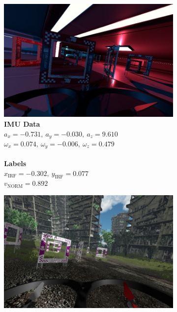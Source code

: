 \begin{figure}[H]
	\centering
	\begin{subfigure}[b]{1.0\textwidth}
		\centering
		\begin{minipage}[c]{0.37\textwidth}
			\includegraphics[width=\textwidth]{figures/camera_frame_00180.jpg}
	  	\end{minipage}\hfill
	  	\begin{minipage}[c]{0.5\textwidth}
			\caption{
				\textbf{IMU Data}\\
				$a_x = -0.731,\ a_y = -0.030,\ a_z = 9.610$\\
				$\omega_x = 0.074,\ \omega_y = -0.006,\ \omega_z = 0.479$\\
				\\
				\textbf{Labels}\\
				$x_\text{IRF} = -0.302,\ y_\text{IRF} = 0.077$\\
				$v_\text{NORM} = 0.892$
				}  
	  	\end{minipage}
	\end{subfigure}
	\begin{subfigure}[b]{1.0\textwidth}
		\centering
		\begin{minipage}[c]{0.37\textwidth}
			\includegraphics[width=\textwidth]{figures/camera_frame_00400.jpg}

\end{minipage}
\end{subfigure}
\end{figure}
